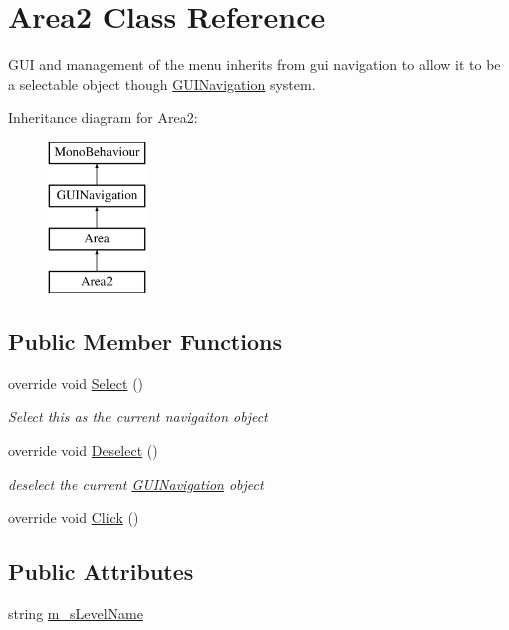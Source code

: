 \hypertarget{class_area2}{}\section{Area2 Class Reference}
\label{class_area2}


G\+UI and management of the menu inherits from gui navigation to allow it to be a selectable object though \mbox{\hyperlink{class_g_u_i_navigation}{G\+U\+I\+Navigation}} system.  


Inheritance diagram for Area2\+:\begin{figure}[H]
\begin{center}
\leavevmode
\includegraphics[height=4.000000cm]{class_area2}
\end{center}
\end{figure}
\subsection*{Public Member Functions}
\begin{DoxyCompactItemize}
\item 
override void \mbox{\hyperlink{class_area2_a099229de36fc80039e1f8ea8d3dca78b}{Select}} ()
\begin{DoxyCompactList}\small\item\em Select this as the current navigaiton object \end{DoxyCompactList}\item 
override void \mbox{\hyperlink{class_area2_a448fdd1ac4233896ff455289c4d43aab}{Deselect}} ()
\begin{DoxyCompactList}\small\item\em deselect the current \mbox{\hyperlink{class_g_u_i_navigation}{G\+U\+I\+Navigation}} object \end{DoxyCompactList}\item 
override void \mbox{\hyperlink{class_area2_aeee901daa00ed32828b4979c5546cad5}{Click}} ()
\end{DoxyCompactItemize}
\subsection*{Public Attributes}
\begin{DoxyCompactItemize}
\item 
string \mbox{\hyperlink{class_area2_a426af96b308118f6800b48c206d2e391}{m\+\_\+s\+Level\+Name}}
\end{DoxyCompactItemize}
